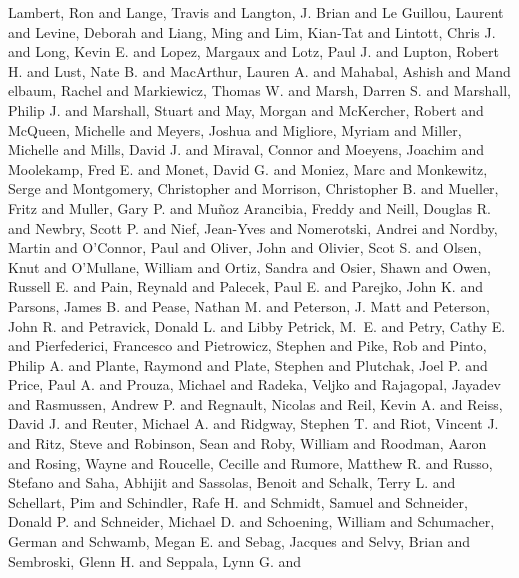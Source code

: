 {{         {Lambert}, Ron and {Lange}, Travis and {Langton}, J. Brian and
         {Le Guillou}, Laurent and {Levine}, Deborah and {Liang}, Ming and
         {Lim}, Kian-Tat and {Lintott}, Chris J. and {Long}, Kevin E. and
         {Lopez}, Margaux and {Lotz}, Paul J. and {Lupton}, Robert H. and
         {Lust}, Nate B. and {MacArthur}, Lauren A. and {Mahabal}, Ashish and {Mand
        elbaum}, Rachel and {Markiewicz}, Thomas W. and {Marsh}, Darren S. and
         {Marshall}, Philip J. and {Marshall}, Stuart and {May}, Morgan and
         {McKercher}, Robert and {McQueen}, Michelle and {Meyers}, Joshua and
         {Migliore}, Myriam and {Miller}, Michelle and {Mills}, David J. and
         {Miraval}, Connor and {Moeyens}, Joachim and {Moolekamp}, Fred E. and
         {Monet}, David G. and {Moniez}, Marc and {Monkewitz}, Serge and
         {Montgomery}, Christopher and {Morrison}, Christopher B. and
         {Mueller}, Fritz and {Muller}, Gary P. and
         {Mu{\~n}oz Arancibia}, Freddy and {Neill}, Douglas R. and
         {Newbry}, Scott P. and {Nief}, Jean-Yves and {Nomerotski}, Andrei and
         {Nordby}, Martin and {O'Connor}, Paul and {Oliver}, John and
         {Olivier}, Scot S. and {Olsen}, Knut and {O'Mullane}, William and
         {Ortiz}, Sandra and {Osier}, Shawn and {Owen}, Russell E. and
         {Pain}, Reynald and {Palecek}, Paul E. and {Parejko}, John K. and
         {Parsons}, James B. and {Pease}, Nathan M. and {Peterson}, J. Matt and
         {Peterson}, John R. and {Petravick}, Donald L. and
         {Libby Petrick}, M.~E. and {Petry}, Cathy E. and
         {Pierfederici}, Francesco and {Pietrowicz}, Stephen and {Pike}, Rob and
         {Pinto}, Philip A. and {Plante}, Raymond and {Plate}, Stephen and
         {Plutchak}, Joel P. and {Price}, Paul A. and {Prouza}, Michael and
         {Radeka}, Veljko and {Rajagopal}, Jayadev and {Rasmussen}, Andrew P. and
         {Regnault}, Nicolas and {Reil}, Kevin A. and {Reiss}, David J. and
         {Reuter}, Michael A. and {Ridgway}, Stephen T. and {Riot}, Vincent J. and
         {Ritz}, Steve and {Robinson}, Sean and {Roby}, William and
         {Roodman}, Aaron and {Rosing}, Wayne and {Roucelle}, Cecille and
         {Rumore}, Matthew R. and {Russo}, Stefano and {Saha}, Abhijit and
         {Sassolas}, Benoit and {Schalk}, Terry L. and {Schellart}, Pim and
         {Schindler}, Rafe H. and {Schmidt}, Samuel and {Schneider}, Donald P. and
         {Schneider}, Michael D. and {Schoening}, William and
         {Schumacher}, German and {Schwamb}, Megan E. and {Sebag}, Jacques and
         {Selvy}, Brian and {Sembroski}, Glenn H. and {Seppala}, Lynn G. and
}}
